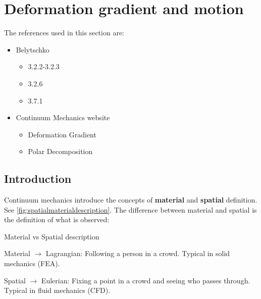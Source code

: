 \section{Deformation gradient and motion}
\label{subsec:deformgradmotion}
\begin{sectionref}
The references used in this section are:
    \begin{itemize}
        \item Belytschko \cite{Belytschko_Liu_Moran_Elkhodary_2014}
        \begin{itemize}
            \item 3.2.2-3.2.3
            \item 3.2.6
            \item 3.7.1
        \end{itemize}
        \item Continuum Mechanics website \cite{McGinty}
        \begin{itemize}
            \item Deformation Gradient
            \item Polar Decomposition
        \end{itemize}
    \end{itemize}
\end{sectionref}

\subsection{Introduction}
Continuum mechanics introduce the concepts of \textbf{material} and \textbf{spatial} definition. See \cref{fig:spatialmaterialdescription}. The difference between material and spatial is the definition of what is observed:
\begin{itemize}
    \begin{keyconcept}[unbreakable]{Material vs Spatial description}
        \label{keyconcept:materialspatial}
            \item Material $\rightarrow$ Lagrangian: Following a person in a crowd. Typical in solid mechanics (FEA).
            \item Spatial $\rightarrow$ Eulerian: Fixing a point in a crowd and seeing who passes through. Typical in fluid mechanics (CFD).
    \end{keyconcept}
\end{itemize}

